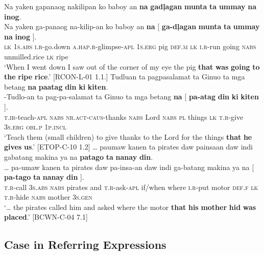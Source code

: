 \ea
\label{bkm:Ref117497845}
Na  yaken  gapanaog  nakilipan    ko baboy  an  \textbf{na}  \textbf{gadļagan}  \textbf{munta}  \textbf{ta}  \textbf{ummay}  \textbf{na}  \textbf{inog}. \\\smallskip
 \gll Na  yaken  ga-panaog  na-kilip-an    ko baboy  an  \textbf{na}  [ \textbf{ga-dļagan}  \textbf{munta}  \textbf{ta}  \textbf{ummay}  \textbf{na}  \textbf{inog} ]. \\
\textsc{lk}  1\textsc{s.abs}  \textsc{i.r}-go.down  \textsc{a.hap.r}-glimpse-\textsc{apl}  1\textsc{s.erg} pig  \textsc{def.m}  \textsc{lk}  {} \textsc{i.r}-run  going  \textsc{nabs}  unmilled.rice  \textsc{lk}  ripe {} \\
\glt `When I went down I saw out of the corner of my eye the pig \textbf{that} \textbf{was} \textbf{going} \textbf{to} \textbf{the} \textbf{ripe} \textbf{rice}.’ [RCON-L-01 1.1.]
\z
\ea
Tudluan  ta  pagpasalamat  ta  Ginuo  ta mga  betang  \textbf{na}  \textbf{paatag}  \textbf{din}  \textbf{ki}  \textbf{kiten}. \\\smallskip
 \gll \emptyset{}-Tudlo-an  ta  pag-pa-salamat  ta  Ginuo  ta mga  betang  \textbf{na}  [ \textbf{pa-atag}  \textbf{din}  \textbf{ki}  \textbf{kiten}{ }]. \\
\textsc{t.ir}-teach-\textsc{apl}  \textsc{nabs}  \textsc{nr.act-caus}-thanks  \textsc{nabs}  Lord \textsc{nabs} \textsc{pl}  things  \textsc{lk} {}  \textsc{t.r}-give  3\textsc{s.erg}  \textsc{obl.p}  1\textsc{p.incl} {} \\
\glt `Teach them (small children) to give thanks to the Lord for  the things \textbf{that} \textbf{he} \textbf{gives} \textbf{us}.’ [ETOP-C-10 1.2]
\z
\ea
… paumaw  kanen  ta  pirates  daw  painsaan  daw  indi gabatang  makina  ya na \textbf{patago}  \textbf{ta}  \textbf{nanay}  \textbf{din}.  \\\smallskip
 \gll … pa-umaw  kanen  ta  pirates  daw  pa-insa-an  daw  indi ga-batang  makina  ya  na  [ \textbf{pa-tago}  \textbf{ta}  \textbf{nanay}  \textbf{din}{ }]. \\
{} \textsc{t.r}-call  3\textsc{s.abs}  \textsc{nabs}  pirates  and  \textsc{t.r}-ask-\textsc{apl}  if/when  where \textsc{i.r}-put  motor  \textsc{def.f} \textsc{lk} {} \textsc{t.r}-hide  \textsc{nabs}  mother  3\textsc{s.gen} {} \\
\glt `… the pirates called him and asked where the motor \textbf{that} \textbf{his} \textbf{mother} \textbf{hid} \textbf{was} \textbf{placed}.' [BCWN-C-04 7.1]
\z 

\subsection{Case in Referring Expressions}
\label{sec:caseinreferringexpressions}

